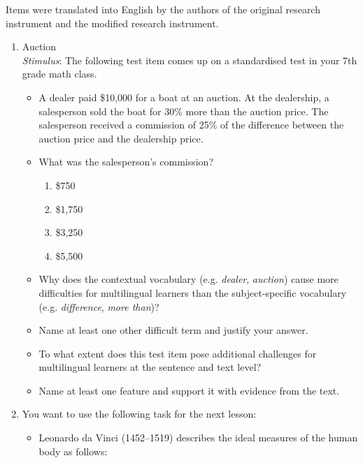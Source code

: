 \documentclass[output=paper]{langscibook}
\begin{document}
\label{appendix:alisaari}

Items were translated into English by the authors of the original research instrument and the modified research instrument.


\begin{enumerate}[label=\Alph*.]
\item  Auction\\
\emph{Stimulus}: The following test item comes up on a standardised test in your 7th grade math class.

\begin{itemize}
\item A dealer paid \$10,000 for a boat at an auction. At the dealership, a salesperson sold the boat for 30\% more than the auction price. The salesperson received a commission of 25\% of the difference between the auction price and the dealership price. 

\item What was the salesperson’s commission? 

\begin{enumerate}
\item \$750
\item \$1,750
\item \$3,250
\item \$5,500
\end{enumerate}

\item Why does the contextual vocabulary (e.g. \emph{dealer}, \emph{auction}) cause more difficulties for multilingual learners than the subject-specific vocabulary (e.g. \emph{difference}, \emph{more than})? 

\item Name at least one other difficult term and justify your answer.

\item To what extent does this test item pose additional challenges for multilingual learners at the sentence and text level? 

\item Name at least one feature and support it with evidence from the text.
\end{itemize}

\item You want to use the following task for the next lesson: 

\begin{itemize}
\item Leonardo da Vinci (1452--1519) describes the ideal measures of the human body as follows:


\end{itemize}
\end{enumerate}
\end{document}
